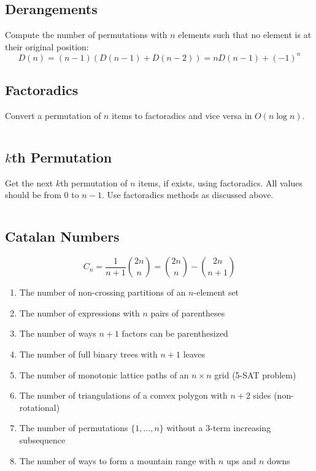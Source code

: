 \documentclass[8pt,a4paper,landscape,oneside]{amsart}
\newcommand{\code}[1]{\inputminted[fontsize=\normalsize,baselinestretch=1]{cpp}{_code/#1}}
\begin{document}
\begin{multicols*}{3}
  \subsection{Derangements}
    Compute the number of permutations with $n$ elements such that no element is at their original position:
    \[
    D(n) = (n-1) \left( D(n-1) + D(n-2) \right) =  n D(n-1) + (-1)^n
    \]
    \subsection{Factoradics}
    Convert a permutation of $n$ items to factoradics and vice versa in $O(n \log n)$.
    \code{combs/factoradics.cpp}
  \subsection{$k$th Permutation}
    Get the next $k$th permutation of $n$ items, if exists, using factoradics. All values should be from $0$ to $n-1$. Use factoradics methods as discussed above.
    \code{combs/kth-permutation.cpp}
  \subsection{Catalan Numbers}
    \[
        C_n = \frac{1}{n+1}\binom{2n}{n} =  \binom{2n}{n}-\binom{2n}{n+1}
    \]
    \begin{enumerate}
      \item The number of non-crossing partitions of an $n$-element set
      \item The number of expressions with $n$ pairs of parentheses
      \item The number of ways $n+1$ factors can be parenthesized
      \item The number of full binary trees with $n+1$ leaves
      \item The number of monotonic lattice paths of an $n \times n$ grid (5-SAT problem)
      \item The number of triangulations of a convex polygon with $n+2$ sides (non-rotational)
      \item The number of permutations $\{1, \ldots, n\}$ without a 3-term increasing subsequence
      \item The number of ways to form a mountain range with $n$ ups and $n$ downs
    \end{enumerate}

\end{multicols*}
\end{document}
